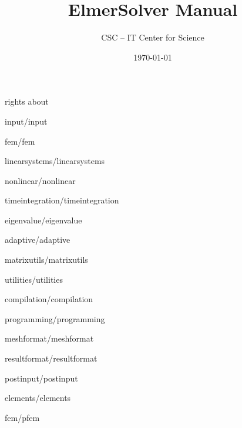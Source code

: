 \documentclass[a4paper,english]{report}    %
\title{\Huge{\bf ElmerSolver Manual}}
\author{CSC -- IT Center for Science}
\date{\today}
\newcommand{\Include}{}
\begin{document}
\maketitle

\begin{versiona}
\Include{rights}
\Include{about}

\pagestyle{empty}
\setcounter{secnumdepth}{2}
\setcounter{tocdepth}{1}  
\tableofcontents

\newpage
\pagestyle{fancy}

\end{versiona}



\graphicspath{{./}{input/}}
\Include{input/input}

\begin{versiona}
\graphicspath{{./}{fem/}}
\Include{fem/fem}
\end{versiona}

\graphicspath{{./}{linearsystems/}}
\Include{linearsystems/linearsystems}

\graphicspath{{./}{nonlinear/}}
\Include{nonlinear/nonlinear}

\graphicspath{{./}{timeintegration/}}
\Include{timeintegration/timeintegration}

\graphicspath{{./}{eigenvalue/}}
\Include{eigenvalue/eigenvalue}

\graphicspath{{./}{adaptive/}}
\Include{adaptive/adaptive}

\graphicspath{{./}{matrixutils/}}
\Include{matrixutils/matrixutils}

\graphicspath{{./}{utilities/}}
\Include{utilities/utilities}

\begin{versiona}


\graphicspath{{./}{compilation/}}
\Include{compilation/compilation}

\graphicspath{{./}{programming/}}
\Include{programming/programming}



\appendix


\graphicspath{{./}{meshformat/}}
\Include{meshformat/meshformat}

\graphicspath{{./}{resultformat/}}
\Include{resultformat/resultformat}

\graphicspath{{./}{postinput/}}
\Include{postinput/postinput}

\graphicspath{{./}{elements/}}
\Include{elements/elements}

\graphicspath{{./}{fem/}}
\Include{fem/pfem}

\end{versiona}
\end{document}

